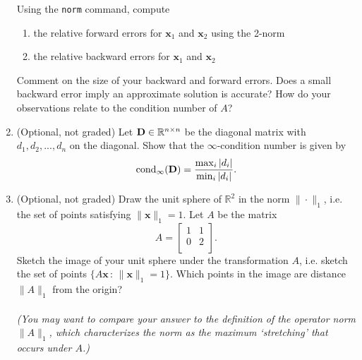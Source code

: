 \documentclass[12pt]{article}
\begin{document}
\begin{enumerate}
Using the \texttt{norm} command, compute
	\begin{enumerate}
	\item the relative forward errors for $\mathbf{x}_1$ and $\mathbf{x}_2$ using the 2-norm
	\item the relative backward errors for $\mathbf{x}_1$ and $\mathbf{x}_2$
	\end{enumerate} 
Comment on the size of your backward and forward errors. Does a small backward error imply an approximate solution is accurate? How do your observations relate to the condition number of $A$?
\item (Optional, not graded) Let ${\bf{D}}\in \mathbb{R}^{n\times n}$ be the diagonal matrix with $d_1,d_2,...,d_n$ on the diagonal. Show that the $\infty$-condition number is given by 
	\[\mathrm{cond}_\infty ({\bf{D}}) = 
	\frac{\max_i|d_i|}{\min_i|d_i|}.\]
\item (Optional, not graded) Draw the unit sphere of $\mathbb{R}^2$ in the norm $\|\cdot\|_1$, i.e. the set of points satisfying $\|\mathbf{x}\|_1=1$. Let $A$ be the matrix
	\[\displaystyle{A = \begin{bmatrix}
    1 & 1 \\
    0 & 2 \\
	\end{bmatrix}}.\]
Sketch the image of your unit sphere under the transformation $A$, i.e. sketch the set of points $\{A\mathbf{x}\,:\,\|\mathbf{x}\|_1 =1\}$. Which points in the image are distance $\|A\|_1$ from the origin? \\\\
\emph{(You may want to compare your answer to the definition of the operator norm $\|A\|_1$, which characterizes the norm as the maximum `stretching' that occurs under $A$.)}
\end{enumerate}
\end{document}
